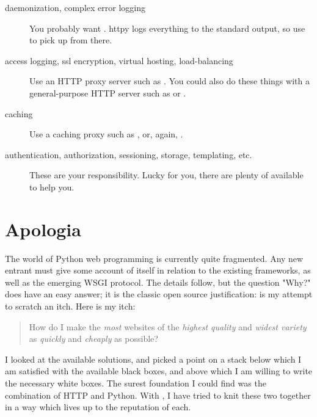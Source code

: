 \begin{description}

\item[daemonization, complex error logging]
    {You probably want . httpy logs everything to the
    standard output, so use
     to pick up from
    there.}

\item[access logging, ssl encryption, virtual hosting, load-balancing]
    {Use an HTTP proxy server such as .
    You could also do these things with a general-purpose HTTP server such as
     or
    .}

\item[caching]
    {Use a caching proxy such as , or,
    again, .}

\item[authentication, authorization, sessioning, storage, templating, etc.]
    {These are your responsibility. Lucky for you, there are plenty of
     available to help
    you.}

\end{description}



\section{Apologia \label{apologia}}

The world of Python web programming is currently quite fragmented. Any new
entrant must give some account of itself in relation to the existing frameworks,
as well as the emerging WSGI protocol. The details follow, but the question
"Why?" does have an easy answer; it is the classic open source justification:
 is my attempt to scratch an itch. Here is my itch:

\begin{quote}
How do I make the \emph{most} websites of the \emph{highest quality} and
\emph{widest variety} as \emph{quickly} and \emph{cheaply} as possible?
\end{quote}

I looked at the available solutions, and picked a point on a stack below which I
am satisfied with the available black boxes, and above which I am willing to
write the necessary white boxes. The surest foundation I could find was the
combination of HTTP and Python. With , I have tried to knit these
two together in a way which lives up to the reputation of each.


